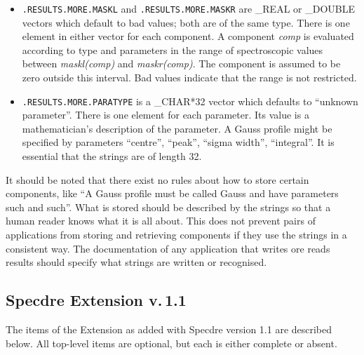 \begin{itemize}
\item{\tt .RESULTS.MORE.MASKL} and {\tt .RESULTS.MORE.MASKR} are \_REAL
   or \_DOUBLE vectors which default to bad values; both are of the same
   type. There is one element in either vector for each component. A
   component {\it comp} is evaluated according to type and parameters in
   the range of spectroscopic values between {\it maskl(comp)} and {\it
   maskr(comp)}. The component is assumed to be zero outside this
   interval. Bad values indicate that the range is not restricted.

\item{\tt .RESULTS.MORE.PARATYPE} is a \_CHAR*32 vector which defaults
   to ``unknown parameter''. There is one element for each
   parameter. Its value is a mathematician's description of the
   parameter. A Gauss profile might be specified by parameters
   ``centre'', ``peak'', ``sigma width'', ``integral''. It is essential
   that the strings are of length 32.
\end{itemize}

   It should be noted that there exist no rules about how to store
   certain components, like ``A Gauss profile must be called Gauss and
   have parameters such and such''. What is stored should be described
   by the strings so that a human reader knows what it is all about.
   This does not prevent pairs of applications from storing and
   retrieving components if they use the strings in a consistent
   way. The documentation of any application that writes ore reads
   results should specify what strings are written or recognised.


\subsection{Specdre Extension v.\,1.1}

   The items of the Extension as added with Specdre version 1.1 are
   described below. All top-level items are optional, but each is either
   complete or absent.

